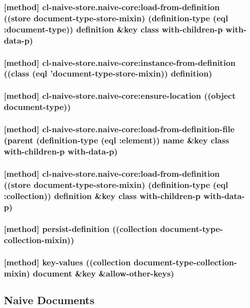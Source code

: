 \documentclass[11pt]{article}
\begin{document}
\subsubsection{[method] cl-naive-store.naive-core:load-from-definition ((store document-type-store-mixin) (definition-type (eql :document-type)) definition \&key class with-children-p with-data-p)}
\label{sec:org8898267}

\subsubsection{[method] cl-naive-store.naive-core:instance-from-definition ((class (eql 'document-type-store-mixin)) definition)}
\label{sec:org953735e}

\subsubsection{[method] cl-naive-store.naive-core:ensure-location ((object document-type))}
\label{sec:org8c6b9fa}

\subsubsection{[method] cl-naive-store.naive-core:load-from-definition-file (parent (definition-type (eql :element)) name \&key class with-children-p with-data-p)}
\label{sec:orgf01e087}

\subsubsection{[method] cl-naive-store.naive-core:load-from-definition ((store document-type-store-mixin) (definition-type (eql :collection)) definition \&key class with-children-p with-data-p)}
\label{sec:orgd38a23d}

\subsubsection{[method] persist-definition ((collection document-type-collection-mixin))}
\label{sec:org167ac7f}

\subsubsection{[method] key-values ((collection document-type-collection-mixin) document \&key \&allow-other-keys)}
\label{sec:orga4072df}

\subsection{Naive Documents}
\label{sec:orgb45735e}
\end{document}
